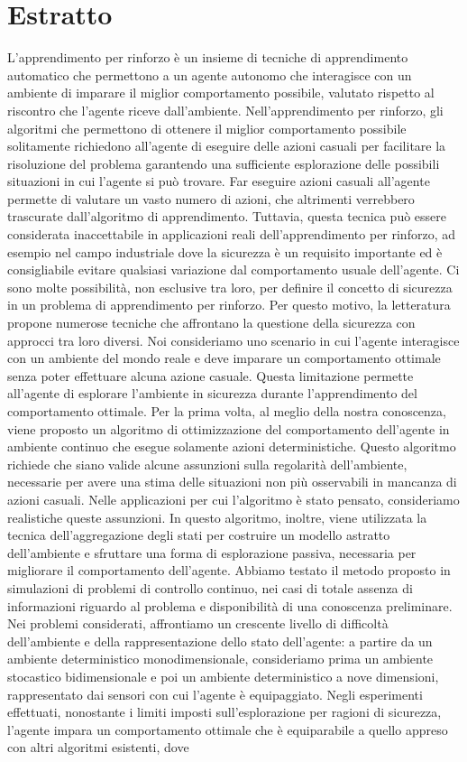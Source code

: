 \chapter*{Estratto}
\sloppy L'apprendimento per rinforzo è un insieme di tecniche di apprendimento automatico che permettono a un agente autonomo che interagisce con un ambiente di imparare il miglior comportamento possibile, valutato rispetto al riscontro che l'agente riceve dall'ambiente. Nell'apprendimento per rinforzo, gli algoritmi che permettono di ottenere il miglior comportamento possibile solitamente richiedono all'agente di eseguire delle azioni casuali per facilitare la risoluzione del problema garantendo una sufficiente esplorazione delle possibili situazioni in cui l'agente si può trovare. Far eseguire azioni casuali all'agente permette di valutare un vasto numero di azioni, che altrimenti verrebbero trascurate dall'algoritmo di apprendimento. Tuttavia, questa tecnica può essere considerata inaccettabile in applicazioni reali dell'apprendimento per rinforzo, ad esempio nel campo industriale dove la sicurezza è un requisito importante ed è consigliabile evitare qualsiasi variazione dal comportamento usuale dell'agente. Ci sono molte possibilità, non esclusive tra loro, per definire il concetto di sicurezza in un problema di apprendimento per rinforzo. Per questo motivo, la letteratura propone numerose tecniche che affrontano la questione della sicurezza con approcci tra loro diversi. Noi consideriamo uno scenario in cui l'agente interagisce con un ambiente del mondo reale e deve imparare un comportamento ottimale senza poter effettuare alcuna azione casuale. Questa limitazione permette all'agente di esplorare l'ambiente in sicurezza durante l'apprendimento del comportamento ottimale. Per la prima volta, al meglio della nostra conoscenza, viene proposto un algoritmo di ottimizzazione del comportamento dell'agente in ambiente continuo che esegue solamente azioni deterministiche. Questo algoritmo richiede che siano valide alcune assunzioni sulla regolarità dell'ambiente, necessarie per avere una stima delle situazioni non più osservabili in mancanza di azioni casuali. Nelle applicazioni per cui l'algoritmo è stato pensato, consideriamo realistiche queste assunzioni. In questo algoritmo, inoltre, viene utilizzata la tecnica dell'aggregazione degli stati per costruire un modello astratto dell'ambiente e sfruttare una forma di esplorazione passiva, necessaria per migliorare il comportamento dell'agente. Abbiamo testato il metodo proposto in simulazioni di problemi di controllo continuo, nei casi di totale assenza di informazioni riguardo al problema e disponibilità di una conoscenza preliminare. Nei problemi considerati, affrontiamo un crescente livello di difficoltà dell'ambiente e della rappresentazione dello stato dell'agente: a partire da un ambiente deterministico monodimensionale, consideriamo prima un ambiente stocastico bidimensionale e poi un ambiente deterministico a nove dimensioni, rappresentato dai sensori con cui l'agente è equipaggiato. Negli esperimenti effettuati, nonostante i limiti imposti sull'esplorazione per ragioni di sicurezza, l'agente impara un comportamento ottimale che è equiparabile a quello appreso con altri algoritmi esistenti, dove 